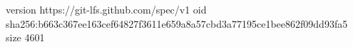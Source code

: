 version https://git-lfs.github.com/spec/v1
oid sha256:b663c367ee163cef64827f3611e659a8a57cbd3a77195ce1bee862f09dd93fa5
size 4601
